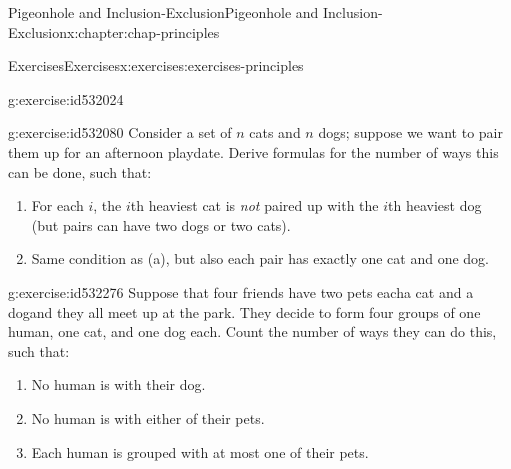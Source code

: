 \documentclass[oneside,10pt,]{book}
\numberwithin{equation}{section}
\begin{document}
\begin{chapterptx}{Pigeonhole and Inclusion-Exclusion}{}{Pigeonhole and Inclusion-Exclusion}{}{}{x:chapter:chap-principles}
\begin{exercises-section}{Exercises}{}{Exercises}{}{}{x:exercises:exercises-principles}
\begin{divisionexercise}{16}{}{}{g:exercise:id532024}
\begin{sidebyside}{1}{0.3}{0.3}{0}
\begin{sbspanel}{0.4}
{}%
\end{sbspanel}%
\end{sidebyside}%
\end{divisionexercise}%
\begin{divisionexercise}{17}{}{}{g:exercise:id532080}%
Consider a set of \(n\) cats and \(n\) dogs; suppose we want to pair them up for an afternoon playdate. Derive formulas for the number of ways this can be done, such that:%
\begin{enumerate}[label=(\alph*)]
\item{}For each \(i\), the \(i\)th heaviest cat is \emph{not} paired up with the \(i\)th heaviest dog (but pairs can have two dogs or two cats).%
\item{}Same condition as (a), but also each pair has exactly one cat and one dog.%
\end{enumerate}
%
\end{divisionexercise}%
\begin{divisionexercise}{18}{}{}{g:exercise:id532276}%
Suppose that four friends have two pets each\textemdash{}a cat and a dog\textemdash{}and they all meet up at the park. They decide to form four groups of one human, one cat, and one dog each. Count the number of ways they can do this, such that:%
\begin{enumerate}[label=(\alph*)]
\item{}No human is with their dog.%
\item{}No human is with either of their pets.%
\item{}Each human is grouped with at most one of their pets.%
\end{enumerate}
%
\end{divisionexercise}%
\end{exercises-section}
\end{chapterptx}
%
%
\typeout{************************************************}
\typeout{************************************************}
%
\end{document}
